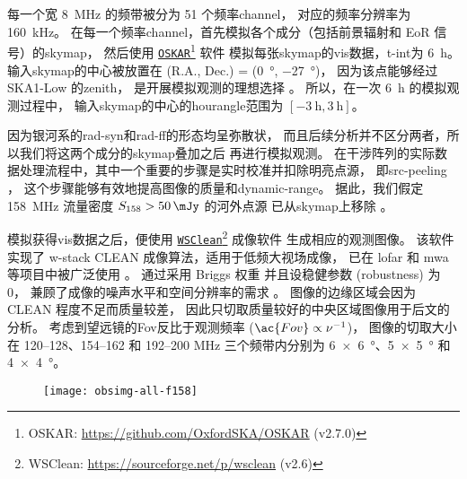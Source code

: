 每一个宽 \SI{8}{\MHz} 的频带被分为 51 个频率\ac{channel}，
对应的频率分辨率为 \SI{160}{\kHz}。
在每一个频率\ac{channel}，首先模拟各个成分（包括前景辐射和 EoR 信号）的\ac{skymap}，
然后使用 \href{https://github.com/OxfordSKA/OSKAR}{\texttt{OSKAR}}\footnote{%
  OSKAR: \url{https://github.com/OxfordSKA/OSKAR} (v2.7.0)}
软件\cite{mort2010}
模拟每张\ac{skymap}的\ac{vis}数据，\ac{t-int}为 \SI{6}{\hour}。
输入\ac{skymap}的中心被放置在
(R.A., Dec.\@) = (\SI{0}{\degree}, \SI{-27}{\degree})，
因为该点能够经过 SKA1-Low 的\ac{zenith}，
是开展模拟观测的理想选择 \cite{liu2009ps,datta2010}。
所以，在一次 \SI{6}{\hour} 的模拟观测过程中，
输入\ac{skymap}的中心的\ac{hourangle}范围为 $[\SI{-3}{\hour}, \SI{3}{\hour}]$。

因为银河系的\ac{rad-syn}和\ac{rad-ff}的形态均呈弥散状，
而且后续分析并不区分两者，所以我们将这两个成分的\ac{skymap}叠加之后
再进行模拟观测。
在干涉阵列的实际数据处理流程中，其中一个重要的步骤是实时校准并扣除明亮点源，
即\ac{src-peeling} \cite{noordam2004,mitchell2008,intema2009}，
这个步骤能够有效地提高图像的质量和\ac{dynamic-range}。
据此，我们假定 \SI{158}{\MHz} 流量密度 $S_{158} > \SI{50}{\mJy}$ 的河外点源
已从\ac{skymap}上移除 \cite{liu2009ps,pindor2011,mort2017}。

模拟获得\ac{vis}数据之后，便使用
\href{https://sourceforge.net/p/wsclean}{\texttt{WSClean}}\footnote{%
  WSClean: \url{https://sourceforge.net/p/wsclean} (v2.6)}
成像软件\cite{offringa2014}
生成相应的观测图像。
该软件实现了 \ac{w-stack} CLEAN 成像算法，适用于低频大视场成像，
已在 \ac{lofar} 和 \ac{mwa} 等项目中被广泛使用 \cite{offringa2014,offringa2017}。
通过采用 Briggs 权重\cite{briggs1995}
并且设稳健参数 (robustness) 为 0，
兼顾了成像的噪声水平和空间分辨率的需求 \cite{briggs1995}。
图像的边缘区域会因为 CLEAN 程度不足而质量较差，
因此只切取质量较好的中央区域图像用于后文的分析。
考虑到望远镜的\acl{Fov}反比于观测频率 ($\ac{Fov} \propto \nu^{-1}$)，
图像的切取大小在 \numrange{120}{128}、\numrange{154}{162} 和
\numrange{192}{200} \si{\MHz} 三个频带内分别为
\SI{6 x 6}{\degree}、\SI{5 x 5}{\degree} 和 \SI{4 x 4}{\degree}。

\begin{figure}[htp]
  \centering
  \texttt{[image: obsimg-all-f158]}
  \label{fig:obsimg-all}
\end{figure}

